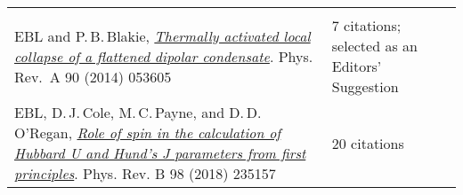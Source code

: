 \documentclass[10pt,a4paper,final]{article}
\begin{document}
\begin{tabularx}{\textwidth}{
      m{}%
      m{}}
   \rowcolor{seaborn_blue}
   \multicolumn{2}{l}{\large\textcolor{seaborn_bg_grey_half}{\textbf{Publications}}}                                                                                                                                                                                                                                                                                                                                                                                                                                                                                                                                                                                                                                                                                                                            \\
   EBL and P.\,B.\,Blakie, \href{https://journals.aps.org/pra/pdf/10.1103/PhysRevA.90.053605}{\textit{Thermally activated local collapse of a flattened dipolar condensate}}. Phys. Rev.~A 90 (2014) 053605                                                                                                                                                                                                                                                                                                                                                                                                                                                                                                                                                   & 7 citations; selected as an Editors' Suggestion \\
   EBL, D.\,J.\,Cole, M.\,C.\,Payne, and D.\,D.\,O'Regan, \href{https://journals.aps.org/prb/abstract/10.1103/PhysRevB.98.235157}{\textit{Role of spin in the calculation of Hubbard U and Hund’s J parameters from first principles}}. Phys. Rev. B 98 (2018) 235157                                                                                                                                                                                                                                                                                                                                                                                                                                                                                         & 20 citations                                    \\

\end{tabularx}
\end{document}

